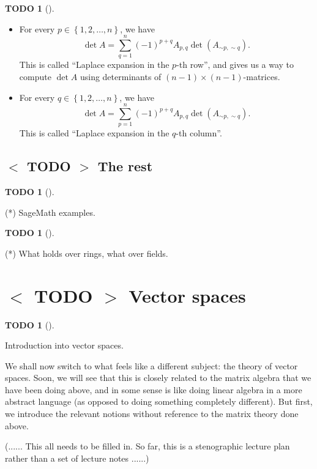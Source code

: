 \documentclass[numbers=enddot,12pt,final,onecolumn,notitlepage]{scrartcl}%
\theoremstyle{definition}
\newtheorem{quest}[theo]{TODO}
\newenvironment{todo}[1][]
{\begin{quest}[#1]\begin{leftbar}}
{\end{leftbar}\end{quest}}
\let\sumnonlimits\sum
\renewcommand{\sum}{\sumnonlimits\limits}
\begin{document}
\begin{todo}
\begin{itemize}
\item For every $p\in\left\{  1,2,\ldots,n\right\}  $, we have%
\[
\det A=\sum_{q=1}^{n}\left(  -1\right)  ^{p+q}A_{p,q}\det\left(  A_{\sim
p,\sim q}\right)  .
\]
This is called \textquotedblleft Laplace expansion in the $p$-th
row\textquotedblright, and gives us a way to compute $\det A$ using
determinants of $\left(  n-1\right)  \times\left(  n-1\right)  $-matrices.

\item For every $q\in\left\{  1,2,\ldots,n\right\}  $, we have%
\[
\det A=\sum_{p=1}^{n}\left(  -1\right)  ^{p+q}A_{p,q}\det\left(  A_{\sim
p,\sim q}\right)  .
\]
This is called \textquotedblleft Laplace expansion in the $q$-th
column\textquotedblright.
\end{itemize}
\end{todo}

\subsection{%
$<$%
TODO%
$>$
The rest}

\begin{todo}
(*) SageMath examples.
\end{todo}

\begin{todo}
(*) What holds over rings, what over fields.
\end{todo}

\section{\label{sect.spaces}%
$<$%
TODO%
$>$
Vector spaces}

\begin{todo}
Introduction into vector spaces.

We shall now switch to what feels like a different subject: the theory of
vector spaces. Soon, we will see that this is closely related to the matrix
algebra that we have been doing above, and in some sense is like doing linear
algebra in a more abstract language (as opposed to doing something completely
different). But first, we introduce the relevant notions without reference to
the matrix theory done above.

(...... This all needs to be filled in. So far, this is a stenographic lecture
plan rather than a set of lecture notes ......)
\end{todo}
\end{document}
